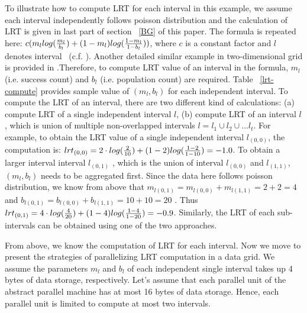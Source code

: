 \documentclass[AMA,LATO1COL]{WileyNJD-v2}
\begin{document}
To illustrate how to compute LRT for each interval in this example, we assume each interval independently follows poisson distribution and the calculation of LRT is given in last part of section ~\ref{BG} of this paper. The formula is repeated here: $c(m_l log ({m_l\over {b_l}})+ (1-m_l)log({{1-m_l}\over {1-b_l}}))$, where $c$ is a constant factor and $l$ denotes interval ~(c.f. \cite{DagMaxmize}). Another detailed similar example in two-dimensional grid is provided in \cite{dke}.Therefore, to compute LRT value of an interval in the formula, $m_l$ (i.e. success count) and $b_l$ (i.e. population count) are required. Table ~\ref{lrt-compute} provides sample value of $(m_l,b_l)$ for each independent interval. To compute the LRT of an interval, there are two different kind of calculations: (a) compute LRT of a single independent interval $l$, (b) compute LRT of an interval $l$, which is union of multiple non-overlapped intervals $l=l_1\cup l_2\cup...l_t$. For example, to obtain the LRT value of a single independent interval $l_{(0,0)}$, the computation is: $lrt_{(0,0)}=2\cdot log({2\over 10})+(1-2)log({{1-2}\over {1-10}})=-1.0$.  To obtain a larger interval interval  $l_{(0,1)}$ , which is the union of interval $l_{(0,0)}$ and $l_{(1,1)}$,  $(m_l, b_l)$ needs to be aggregated first. Since the data here follows poisson distribution, we know from above that $m_{l(0,1)}=m_{l(0,0)}+m_{l(1,1)}=2+2=4$ and $b_{l(0,1)}=b_{l(0,0)}+b_{l(1,1)}=10+10=20$ . Thus $lrt_{(0,1)}=4\cdot log({4\over 20})+(1-4)log({{1-4}\over {1-20}})=-0.9$. Similarly, the LRT of each sub-intervals can be obtained using one of the two approaches. 

From above, we know the computation of LRT for each interval. Now we move to present the strategies of parallelizing LRT computation in a data grid.  We assume the parameters $m_l$ and $b_l$ of each independent single interval takes up 4 bytes of data storage, respectively. Let's assume that each parallel unit of the abstract parallel machine has at most 16 bytes of data storage. Hence, each parallel unit is limited to compute at most two intervals.
\end{document}

